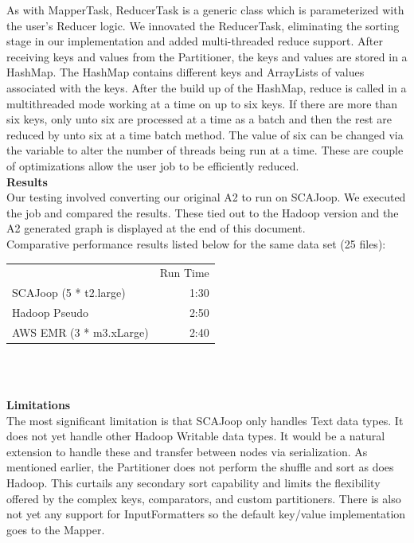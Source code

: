 \documentclass{article}
\begin{document}
As with MapperTask, ReducerTask is a generic class which is parameterized with the user’s Reducer logic. We innovated the ReducerTask, eliminating the sorting stage in our implementation and added multi-threaded reduce support. After receiving keys and values from the Partitioner, the keys and values are stored in a HashMap. The HashMap contains different keys and ArrayLists of values associated with the keys. After the build up of the HashMap, reduce is called in a multithreaded mode working at a time on up to six keys. If there are more than six keys, only unto six are processed at a time as a batch and then the rest are reduced by unto six at a time batch method. The value of six can be changed via the variable to alter the number of threads being run at a time. These are couple of optimizations allow the user job to be efficiently reduced.\\

\textbf{Results} \\
Our testing involved converting our original A2 to run on SCAJoop. We executed the job and compared the results. These tied out to the Hadoop version and the A2 generated graph is displayed at the end of this document. \\
Comparative performance results listed below for the same data set (25 files):
\par
\bigskip
\begin{tabular}{| l | r |}
   & Run Time \\
  SCAJoop (5 * t2.large) & 1:30  \\
  Hadoop Pseudo & 2:50 \\
  AWS EMR  (3 * m3.xLarge) & 2:40 \\
\end{tabular}\\
\bigskip

\textbf{}\\   
\textbf{Limitations} \\
The most significant limitation is that SCAJoop only handles Text data types. It does not yet handle other Hadoop Writable data types. It would be a natural extension to handle these and transfer between nodes via serialization. As mentioned earlier, the Partitioner does not perform the shuffle and sort as does Hadoop. This curtails any secondary sort capability and limits the flexibility offered by the complex keys, comparators, and custom partitioners. There is also not yet any support for InputFormatters so the default key/value implementation goes to the Mapper.\\
\end{document}
